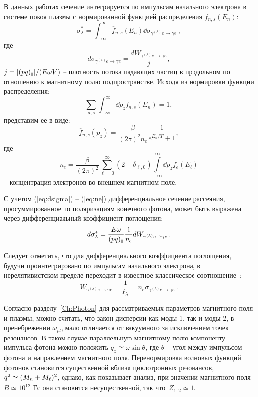 В данных работах сечение интегрируется по импульсам начального 
электрона в системе покоя плазмы
с нормированной функцией распределения $\overline{f}_{n,s}(E_n)$:
\begin{equation}\label{eq:dsigma}
	\sigma^*_\lambda=\int_{-\infty}^{\infty} 
	\overline{f}_{n,s}(E_n)\dd\sigma_{\gamma^{(\lambda)} e\to \gamma e}\, ,
\end{equation}
где 
\begin{equation}
	d\sigma_{\gamma^{(\lambda)} e\to \gamma e}= \frac{dW_{\gamma^{(\lambda)} e \to \gamma e}}{j},
\end{equation}
$j=|(pq)_{\mbox{\tiny $\|$}}|/(E \omega V)$ -- плотность потока падающих 
частиц  в продольном по отношению к магнитному полю подпространстве. Исходя из 
нормировки функции распределения:
\begin{equation}
	\sum_{n,s}\int_{-\infty}^{\infty} \dd p_z \overline{f}_{n,s}(E_n)=1,
\end{equation}
представим ее в виде:
\begin{equation}
	\overline{f}_{n,s}(p_z)=\frac{\beta}{(2\pi)^2n_e}\frac{1}{e^{E_n/T}+1},
\end{equation}
где 
\begin{equation}\label{eq:ne}
	n_e = \frac{\beta}{(2 \pi)^2} \sum \limits^{\infty}_{\ell=0} 
	(2-\delta_{\ell,0}) \int \limits^{\infty}_{-\infty}\dd p_z f_{e}(E_{\ell})
\end{equation}
-- концентрация электронов во внешнем магнитном поле.

С учетом (\ref{eq:dsigma}) -- (\ref{eq:ne}) дифференциальное сечение рассеяния, просуммированное по 
поляризациям конечного фотона, может быть выражена через дифференциальный 
коэффициент поглощения:
\begin{equation}
	d\sigma^*_\lambda=\frac{E\omega}{(pq)_{\mbox{\tiny $\|$}}}\frac{1}{n_e} 
	dW_{\gamma^{(\lambda)} e\to\gamma e}\, .
\end{equation}

Следует отметить, что для дифференциального коэффициента поглощения, будучи 
проинтегрировано по импульсам 
начального 
электрона, в 
нерелятивистском пределе переходит в известное классическое соотношение~\cite{Landau:1989}:
\begin{equation}
W_{\gamma^{(\lambda)} e\to\gamma e}=\frac{1}{\ell_\lambda}=n_e 
\sigma_{\gamma^{(\lambda)} e\to\gamma e}\, .
\end{equation}


Согласно разделу~\ref{Ch:Photon} для рассматриваемых параметров магнитного 
поля и плазмы, можно считать, что закон дисперсии как моды 1, так и моды 2, в 
пренебрежении $\omega_{pl}$, мало отличается от вакуумного за исключением точек 
резонансов. В таком случае параллельную магнитному полю компоненту импульса 
фотона можно положить
$q_z \simeq \omega \sin{\theta}$, где 
$\theta$ -- угол между импульсом фотона и направлением магнитного поля. 
Перенормировка волновых функций фотонов становится существенной вблизи 
циклотронных резонансов, $q^2_{\mbox{\tiny $\|$}} \simeq (M_n+M_{\ell})^2$, однако, как 
показывает анализ, при значении магнитного поля $B\simeq 10^{12}$ Гс она 
становится несущественной, так что~$Z_{1,2}\simeq 1$. 

